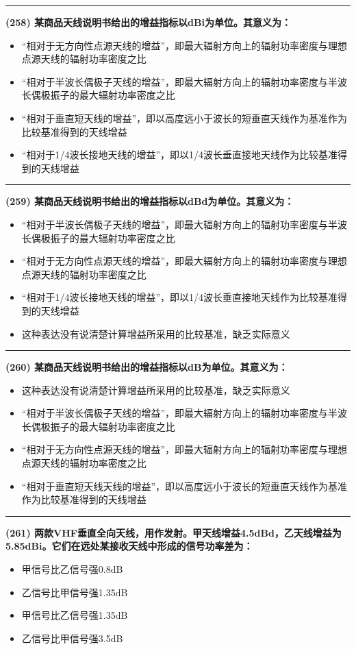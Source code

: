 \documentclass[twocolumn]{ctexart}  %
\begin{document}
\noindent\rule{0.5\textwidth}{1pt}
\heiti \textbf{(258) 某商品天线说明书给出的增益指标以dBi为单位。其意义为：} \songti {\color{gray} [LK0929] }
\begin{itemize}
	\item  “相对于无方向性点源天线的增益”，即最大辐射方向上的辐射功率密度与理想点源天线的辐射功率密度之比
	\item  “相对于半波长偶极子天线的增益”，即最大辐射方向上的辐射功率密度与半波长偶极振子的最大辐射功率密度之比
	\item  “相对于垂直短天线的增益”，即以高度远小于波长的短垂直天线作为基准作为比较基准得到的天线增益
	\item  “相对于1/4波长接地天线的增益”，即以1/4波长垂直接地天线作为比较基准得到的天线增益
\end{itemize}


\noindent\rule{0.5\textwidth}{1pt}
\heiti \textbf{(259) 某商品天线说明书给出的增益指标以dBd为单位。其意义为：} \songti {\color{gray} [LK0930] }
\begin{itemize}
	\item  “相对于半波长偶极子天线的增益”，即最大辐射方向上的辐射功率密度与半波长偶极振子的最大辐射功率密度之比
	\item  “相对于无方向性点源天线的增益”，即最大辐射方向上的辐射功率密度与理想点源天线的辐射功率密度之比
	\item  “相对于1/4波长接地天线的增益”，即以1/4波长垂直接地天线作为比较基准得到的天线增益
	\item  这种表达没有说清楚计算增益所采用的比较基准，缺乏实际意义
\end{itemize}


\noindent\rule{0.5\textwidth}{1pt}
\heiti \textbf{(260) 某商品天线说明书给出的增益指标以dB为单位。其意义为：} \songti {\color{gray} [LK0931] }
\begin{itemize}
	\item  这种表达没有说清楚计算增益所采用的比较基准，缺乏实际意义
	\item  “相对于半波长偶极子天线的增益”，即最大辐射方向上的辐射功率密度与半波长偶极振子的最大辐射功率密度之比
	\item  “相对于无方向性点源天线的增益”，即最大辐射方向上的辐射功率密度与理想点源天线的辐射功率密度之比
	\item  “相对于垂直短天线天线的增益”，即以高度远小于波长的短垂直天线作为基准作为比较基准得到的天线增益
\end{itemize}


\noindent\rule{0.5\textwidth}{1pt}
\heiti \textbf{(261) 两款VHF垂直全向天线，用作发射。甲天线增益4.5dBd，乙天线增益为5.85dBi。它们在远处某接收天线中形成的信号功率差为：} \songti {\color{gray} [LK0932] }
\begin{itemize}
	\item  甲信号比乙信号强0.8dB
	\item  乙信号比甲信号强1.35dB
	\item  甲信号比乙信号强1.35dB
	\item  乙信号比甲信号强3.5dB
\end{itemize}
\end{document}

